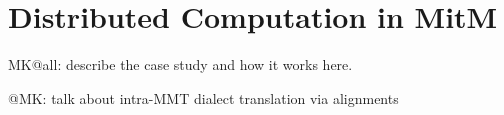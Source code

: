 \section{Distributed Computation in MitM}\label{sec:case}
\begin{todolist}{MK@all: describe the case study and how it works here.}
\item @MK: talk about intra-MMT dialect translation via alignments 
\end{todolist}


